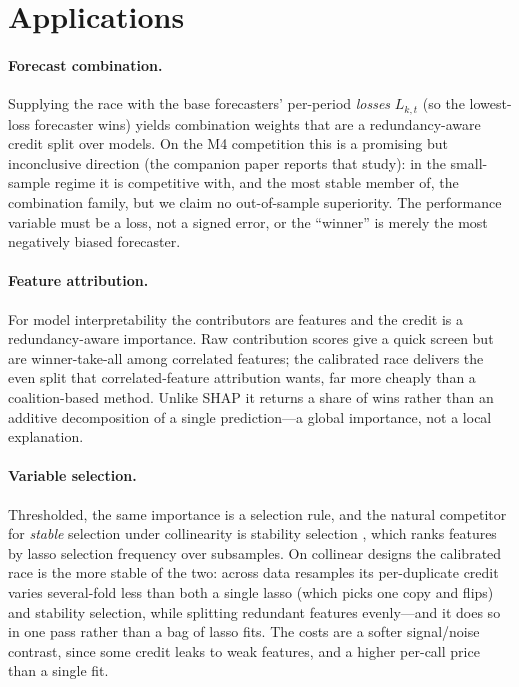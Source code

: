 \documentclass[11pt]{article}
\begin{document}
\section{Applications}
\label{sec:apps}

\paragraph{Forecast combination.}
Supplying the race with the base forecasters' per-period \emph{losses}
$L_{k,t}$ (so the lowest-loss forecaster wins) yields combination weights that are a
redundancy-aware credit split over models. On the M4 competition this is a promising
but inconclusive direction (the companion paper reports that study): in the
small-sample regime it is competitive with, and the most stable member of, the
combination family, but we claim no out-of-sample superiority. The performance
variable must be a loss, not a signed error, or the ``winner'' is merely the most
negatively biased forecaster.

\paragraph{Feature attribution.}
For model interpretability the contributors are features and the credit is a
redundancy-aware importance. Raw contribution scores give a quick screen but are
winner-take-all among correlated features; the calibrated race delivers the even
split that correlated-feature attribution wants, far more cheaply than a
coalition-based method. Unlike SHAP it returns a share of wins rather than an
additive decomposition of a single prediction---a global importance, not a local
explanation.

\paragraph{Variable selection.}
Thresholded, the same importance is a selection rule, and the natural competitor for
\emph{stable} selection under collinearity is stability selection
\parencite{meinshausen2010}, which ranks features by lasso selection frequency over
subsamples. On collinear designs the calibrated race is the more stable of the two:
across data resamples its per-duplicate credit varies several-fold less than both a
single lasso (which picks one copy and flips) and stability selection, while
splitting redundant features evenly---and it does so in one pass rather than a bag of
lasso fits. The costs are a softer signal/noise contrast, since some credit leaks to
weak features, and a higher per-call price than a single fit.
\end{document}
